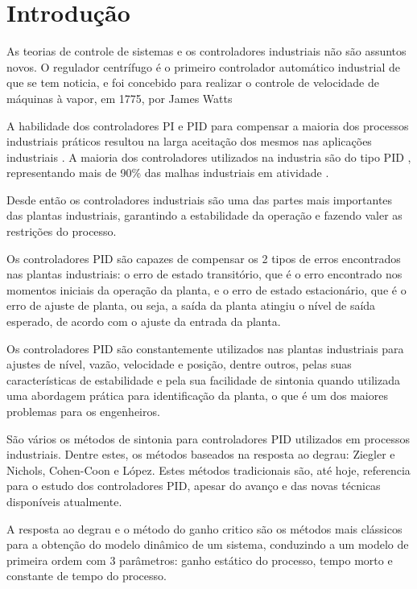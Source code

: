 \chapter{Introdução\label{cap:introducao}}

    As teorias de controle de sistemas e os controladores industriais não são assuntos
    novos. O regulador centrífugo é o primeiro controlador automático industrial de que
    se tem noticia, e foi concebido para realizar o controle de velocidade de máquinas
    à vapor, em 1775, por James Watts \cite{senai}

    A habilidade dos controladores \ac{PI} e \ac{PID} para compensar a maioria dos processos
    industriais práticos resultou na larga aceitação dos mesmos nas aplicações industriais
    \cite{Dwyer}. A maioria dos controladores utilizados na industria são do tipo
    \acs{PID} \cite{astrom1984645}, representando mais de 90\% das malhas industriais
    em atividade \cite{astrom20011163}. 

    Desde então os controladores industriais são uma das partes mais importantes das
    plantas industriais, garantindo a estabilidade da operação e fazendo valer as restrições
    do processo.

    Os controladores \acs{PID} são capazes de compensar os 2 tipos de erros encontrados
    nas plantas industriais: o erro de estado transitório, que é o erro encontrado nos momentos
    iniciais da operação da planta, e o erro de estado estacionário, que é o erro de
    ajuste de planta, ou seja, a saída da planta atingiu o nível de saída esperado, de
    acordo com o ajuste da entrada da planta.

    Os controladores \acs{PID} são constantemente utilizados nas plantas industriais para
    ajustes de nível, vazão, velocidade e posição, dentre outros, pelas suas características
    de estabilidade e pela sua facilidade de sintonia quando utilizada uma abordagem prática
    para identificação da planta, o que é um dos maiores problemas para os engenheiros.

    São vários os métodos de sintonia para controladores \acs{PID} utilizados em processos
    industriais. Dentre estes, os métodos baseados na resposta ao degrau: Ziegler e Nichols,
    Cohen-Coon e López. Estes métodos tradicionais são, até hoje, referencia para o estudo
    dos controladores \ac{PID}, apesar do avanço e das novas técnicas disponíveis atualmente.

    A resposta ao degrau e o método do ganho critico são os métodos mais clássicos para a
    obtenção do modelo dinâmico de um sistema, conduzindo a um modelo de primeira ordem
    com 3 parâmetros: ganho estático do processo, tempo morto e constante de tempo do processo.
    \cite{carmo}


